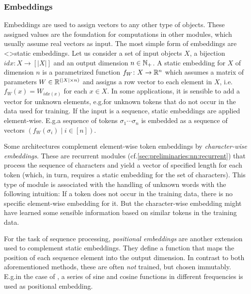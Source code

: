 \documentclass[../document.tex]{subfiles}
\begin{document}
    \subsubsection{Embeddings}
    Embeddings are used to assign vectors to any other type of objects.
    These assigned values are the foundation for computations in other modules, which usually assume real vectors as input.
    The most simple form of embeddings are <>{static embeddings}.
    Let us consider a set of input objects \(X\), a bijection \(\mathit{idx}\colon X \to [|X|]\) and an output dimension \(n \in \mathbb{N}_+\).
    A static embedding for \(X\) of dimension \(n\) is a parametrized function \(f_W\colon X \to \mathbb{R}^n\) which assumes a matrix of parameters \(W \in \mathbb{R}^{(|X| \times n)}\) and assigns a row vector to each element in \(X\), i.e.\@ \(f_W(x) = W_{\mathit{idx}(x)}\) for each \(x \in X\).
    In some applications, it is sensible to add a vector for unknown elements, e.g.\@ for unknown tokens that do not occur in the data used for training.
    If the input is a sequence, static embeddings are applied element-wise.
    E.g.\@ a sequence of tokens \(\sigma_1 \cdots \sigma_n\) is embedded as a sequence of vectors \((f_W(\sigma_i) \mid i \in [n])\).

    Some architectures complement element-wise token embeddings by \emph{character-wise embeddings}. \citep{}
    These are recurrent modules (cf.\@ \cref{sec:preliminaries:nn:recurrent}) that process the sequence of characters and yield a vector of specified length for each token (which, in turn, requires a static embedding for the set of characters).
    This type of module is associated with the handling of unknown words with the following intuition:
        If a token does not occur in the training data, there is no specific element-wise embedding for it.
        But the character-wise embedding might have learned some sensible information based on similar tokens in the training data.

    For the task of sequence processing, \emph{positional embeddings} are another extension used to complement static embeddings.
    They define a function that maps the position of each sequence element into the output dimension.
    In contrast to both aforementioned methods, these are often \emph{not} trained, but chosen immutably.
    E.g.\@ in the case of , a series of sine and cosine functions in different frequencies is used as positional embedding.

\end{document}
